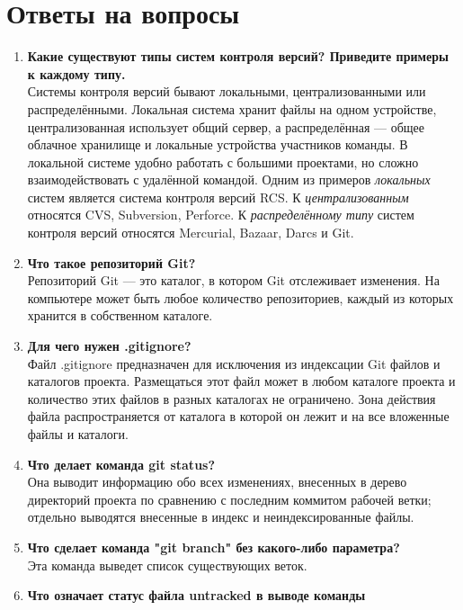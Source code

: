 \chapter*{Ответы на вопросы}

\begin{enumerate}
    \item \textbf{Какие существуют типы систем контроля версий?
    Приведите примеры к каждому типу.}\\
    Системы контроля версий бывают локальными, централизованными или
    распределёнными. Локальная система хранит файлы на одном устройстве,
    централизованная использует общий сервер, а распределённая --- общее
    облачное хранилище и локальные устройства участников команды.
    В локальной системе удобно работать с большими проектами,
    но сложно взаимодействовать с удалённой командой.
    Одним из примеров \textit{локальных} систем является система
    контроля версий RCS.
    К \textit{централизованным} относятся CVS, Subversion, Perforce.
    К \textit{распределённому типу} систем контроля версий относятся
    Mercurial, Bazaar, Darcs и Git.
    \item \textbf{Что такое репозиторий Git?}\\
    Репозиторий Git --- это каталог, в котором Git отслеживает изменения.
    На компьютере может быть любое количество репозиториев,
    каждый из которых хранится в собственном каталоге.
    \item \textbf{Для чего нужен .gitignore?}\\
    Файл .gitignore предназначен для исключения из индексации Git файлов
    и каталогов проекта. Размещаться этот файл может в любом каталоге
    проекта и количество этих файлов в разных каталогах не ограничено.
    Зона действия файла распространяется от каталога в которой он лежит
    и на все вложенные файлы и каталоги.
    \item \textbf{Что делает команда git status?}\\
    Она выводит информацию обо всех изменениях, внесенных в дерево
    директорий проекта по сравнению с последним коммитом рабочей ветки;
    отдельно выводятся внесенные в индекс и неиндексированные файлы.
    \item \textbf{Что сделает команда "git branch" без какого-либо параметра?}\\
    Эта команда выведет список существующих веток.
    \item \textbf{Что означает статус файла untracked в выводе команды
}
\end{enumerate}
